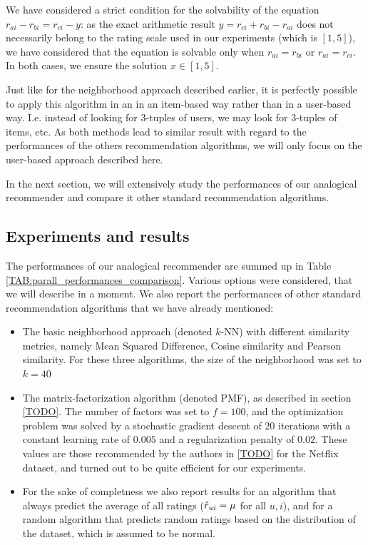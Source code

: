 We have considered a strict condition for the solvability of the equation
$r_{ai} - r_{bi} = r_{ci} - y$: as the exact arithmetic result $y=r_{ci} +
r_{bi} -r_{ai}$ does not necessarily belong to the rating scale used in our
experiments (which is $[1,5]$), we have
considered that the equation is solvable only when $r_{ai}=r_{bi}$ or
$r_{ai}=r_{ci}$. In both cases, we ensure the solution $x \in
[1,5]$.

Just like for the neighborhood approach described earlier, it is perfectly
possible to apply this algorithm in an in an item-based way rather
than in a user-based way. I.e. instead of looking for $3$-tuples of users, we
may look for $3$-tuples of items, etc. As both methods lead to similar result
with regard to the performances of the others recommendation algorithms, we
will only focus on the user-based approach described here.

In the next section, we will extensively study the performances of our
analogical recommender and compare it other standard recommendation algorithms.

\subsection{Experiments and results}
\label{results}

The performances of our analogical recommender are summed up in Table
\ref{TAB:parall_performances_comparison}. Various options were considered, that
we will describe in a moment. We also report the performances of other standard
recommendation algorithms that we have already mentioned:
\begin{itemize}
  \item The basic neighborhood approach (denoted $k$-NN) with different
    similarity metrics, namely Mean Squared Difference, Cosine similarity and
    Pearson similarity.  For these three algorithms, the size of the
    neighborhood was set to $k=40$
  \item The matrix-factorization algorithm (denoted PMF), as described in section \ref{TODO}.
    The number of factors was set to $f = 100$, and the optimization problem
    was solved by a stochastic gradient descent of $20$ iterations with
    a constant learning rate of $0.005$ and a regularization penalty of $0.02$.
    These values are those recommended by the authors in \ref{TODO} for the
    Netflix dataset, and turned out to be quite efficient for our experiments.
  \item For the sake of completness we also report results for an algorithm
    that always predict the average of all ratings ($\hat{r}_{ui} = \mu$ for all
    $u, i$), and for a random algorithm that predicts random ratings based on
    the distribution of the dataset, which is assumed to be normal.
\end{itemize}

